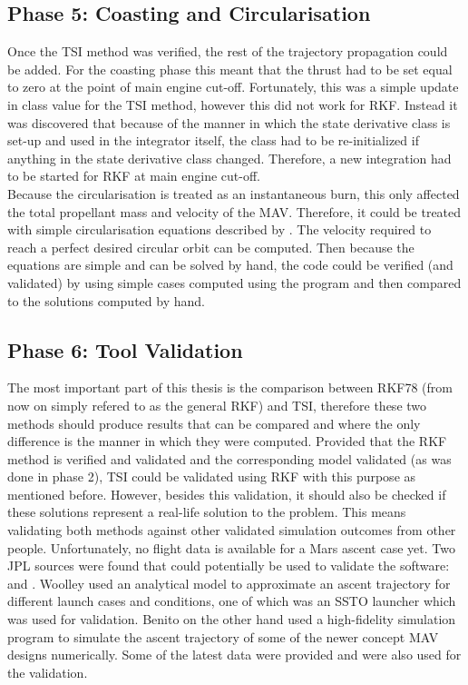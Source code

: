 \subsection{Phase 5: Coasting and Circularisation}
\label{subsec:phase5com}
Once the \ac{TSI} method was verified, the rest of the trajectory propagation could be added. For the coasting phase this meant that the thrust had to be set equal to zero at the point of main engine cut-off. Fortunately, this was a simple update in class value for the \ac{TSI} method, however this did not work for \ac{RKF}. Instead it was discovered that because of the manner in which the state derivative class is set-up and used in the integrator itself, the class had to be re-initialized if anything in the state derivative class changed. Therefore, a new integration had to be started for \ac{RKF} at main engine cut-off. \\

\noindent
Because the circularisation is treated as an instantaneous burn, this only affected the total propellant mass and velocity of the \ac{MAV}. Therefore, it could be treated with simple circularisation equations described by \cite{wakker2010}. The velocity required to reach a perfect desired circular orbit can be computed. Then because the equations are simple and can be solved by hand, the code could be verified (and validated) by using simple cases computed using the program and then compared to the solutions computed by hand. 

\subsection{Phase 6: Tool Validation}
\label{subsec:phase6com}
The most important part of this thesis is the comparison between \ac{RKF78} (from now on simply refered to as the general \ac{RKF}) and \ac{TSI}, therefore these two methods should produce results that can be compared and where the only difference is the manner in which they were computed. Provided that the \ac{RKF} method is verified and validated and the corresponding model validated (as was done in phase 2), \ac{TSI} could be validated using \ac{RKF} with this purpose as mentioned before. However, besides this validation, it should also be checked if these solutions represent a real-life solution to the problem. This means validating both methods against other validated simulation outcomes from other people. Unfortunately, no flight data is available for a Mars ascent case yet. Two \ac{JPL} sources were found that could potentially be used to validate the software: \cite{woolley2015simple} and \cite{benito2016trajectory}. Woolley used an analytical model to approximate an ascent trajectory for different launch cases and conditions, one of which was an \ac{SSTO} launcher which was used for validation. Benito on the other hand used a high-fidelity simulation program to simulate the ascent trajectory of some of the newer concept \ac{MAV} designs numerically. Some of the latest data were provided and were also used for the validation.\\

